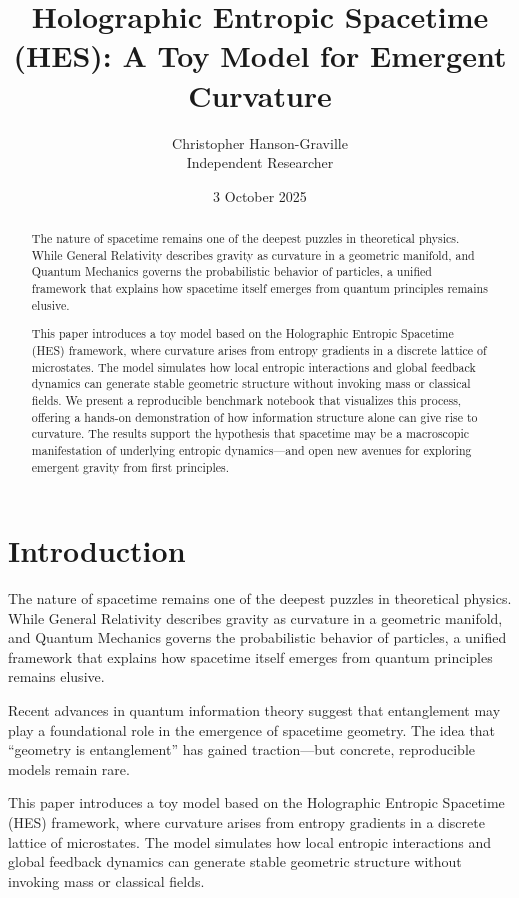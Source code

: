 \documentclass[12pt]{article}
\title{Holographic Entropic Spacetime (HES): A Toy Model for Emergent Curvature}
\author{Christopher Hanson-Graville \\ \small{Independent Researcher}}
\date{3 October 2025}
\begin{document}
\maketitle

\begin{abstract}
The nature of spacetime remains one of the deepest puzzles in theoretical physics. While General Relativity describes gravity as curvature in a geometric manifold, and Quantum Mechanics governs the probabilistic behavior of particles, a unified framework that explains how spacetime itself emerges from quantum principles remains elusive.

This paper introduces a toy model based on the Holographic Entropic Spacetime (HES) framework, where curvature arises from entropy gradients in a discrete lattice of microstates. The model simulates how local entropic interactions and global feedback dynamics can generate stable geometric structure without invoking mass or classical fields. We present a reproducible benchmark notebook that visualizes this process, offering a hands-on demonstration of how information structure alone can give rise to curvature. The results support the hypothesis that spacetime may be a macroscopic manifestation of underlying entropic dynamics—and open new avenues for exploring emergent gravity from first principles.
\end{abstract}

\section{Introduction}

The nature of spacetime remains one of the deepest puzzles in theoretical physics. While General Relativity describes gravity as curvature in a geometric manifold, and Quantum Mechanics governs the probabilistic behavior of particles, a unified framework that explains how spacetime itself emerges from quantum principles remains elusive.

Recent advances in quantum information theory suggest that entanglement may play a foundational role in the emergence of spacetime geometry. The idea that “geometry is entanglement” has gained traction—but concrete, reproducible models remain rare.

This paper introduces a toy model based on the Holographic Entropic Spacetime (HES) framework, where curvature arises from entropy gradients in a discrete lattice of microstates. The model simulates how local entropic interactions and global feedback dynamics can generate stable geometric structure without invoking mass or classical fields.
\end{document}
